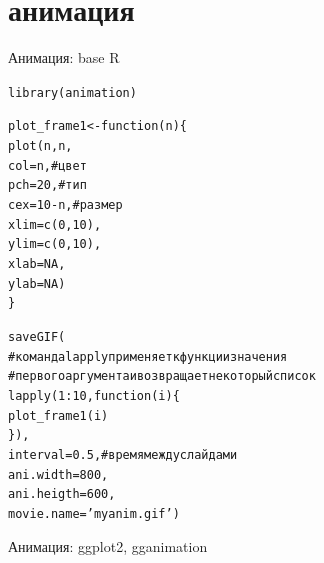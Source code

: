 \section{анимация}
\begin{frame}[fragile]{Анимация: base R}
\scriptsize
\begin{alltt}
library(animation)

plot_frame1 <- function(n) \{
plot(n, n,
     col = n, \hfill # цвет
     pch = 20, \hfill  # тип
     cex = 10 - n, \hfill  # размер
     xlim = c(0, 10),
     ylim = c(0, 10),
     xlab = NA,
     ylab = NA)
\}

saveGIF(
# команда lapply применяет к функции значения
# первого аргумента и возвращает некоторый список
  lapply(1:10, function(i) \{
    plot_frame1(i)
  \}),
  interval = 0.5, # время между слайдами
  ani.width = 800,
  ani.heigth = 600,
  movie.name = 'myanim.gif')
\end{alltt}
\normalsize
\end{frame}
\begin{frame}{Анимация: ggplot2, gganimation}
\end{frame}
